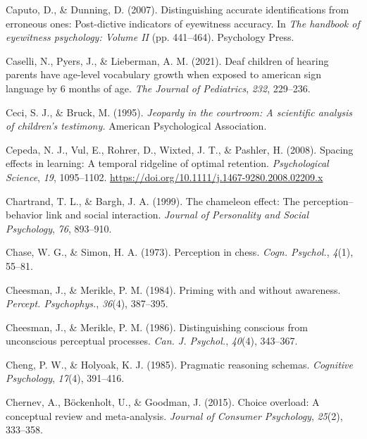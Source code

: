 \documentclass[
]{krantz}
\newlength{\cslhangindent}
\newenvironment{CSLReferences}[2] %
 {\begin{list}{}{%
  \setlength{\itemindent}{0pt}
  \setlength{\leftmargin}{0pt}
  \setlength{\parsep}{0pt}
  \ifodd #1
   \setlength{\leftmargin}{\cslhangindent}
   \setlength{\itemindent}{-1\cslhangindent}
  \fi
  \setlength{\itemsep}{#2\baselineskip}}}
 {\end{list}}
\begin{document}
\begin{CSLReferences}{1}{0}
Caputo, D., \& Dunning, D. (2007). Distinguishing accurate identifications from erroneous ones: Post-dictive indicators of eyewitness accuracy. In \emph{The handbook of eyewitness psychology: Volume II} (pp. 441--464). Psychology Press.

Caselli, N., Pyers, J., \& Lieberman, A. M. (2021). Deaf children of hearing parents have age-level vocabulary growth when exposed to american sign language by 6 months of age. \emph{The Journal of Pediatrics}, \emph{232}, 229--236.

Ceci, S. J., \& Bruck, M. (1995). \emph{Jeopardy in the courtroom: A scientific analysis of children's testimony.} American Psychological Association.

Cepeda, N. J., Vul, E., Rohrer, D., Wixted, J. T., \& Pashler, H. (2008). Spacing effects in learning: A temporal ridgeline of optimal retention. \emph{Psychological Science}, \emph{19}, 1095--1102. \url{https://doi.org/10.1111/j.1467-9280.2008.02209.x}

Chartrand, T. L., \& Bargh, J. A. (1999). The chameleon effect: The perception--behavior link and social interaction. \emph{Journal of Personality and Social Psychology}, \emph{76}, 893--910.

Chase, W. G., \& Simon, H. A. (1973). Perception in chess. \emph{Cogn. Psychol.}, \emph{4}(1), 55--81.

Cheesman, J., \& Merikle, P. M. (1984). Priming with and without awareness. \emph{Percept. Psychophys.}, \emph{36}(4), 387--395.

Cheesman, J., \& Merikle, P. M. (1986). Distinguishing conscious from unconscious perceptual processes. \emph{Can. J. Psychol.}, \emph{40}(4), 343--367.

Cheng, P. W., \& Holyoak, K. J. (1985). Pragmatic reasoning schemas. \emph{Cognitive Psychology}, \emph{17}(4), 391--416.

Chernev, A., Böckenholt, U., \& Goodman, J. (2015). Choice overload: A conceptual review and meta-analysis. \emph{Journal of Consumer Psychology}, \emph{25}(2), 333--358.


\end{CSLReferences}
\end{document}
